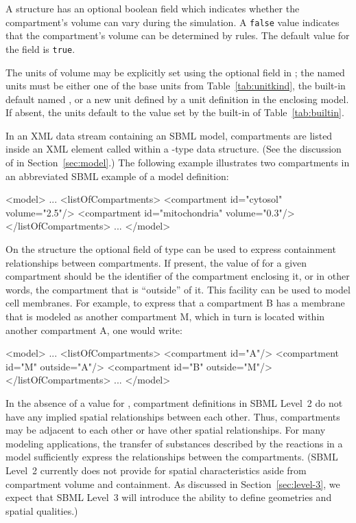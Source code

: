 \documentclass[10pt]{cekarticle}
\newcommand{\vref}[1]{\ref{#1}}
\begin{document}
A  structure has an optional 
boolean field which indicates whether the compartment's volume can
vary during the simulation.  A \texttt{false} value indicates that
the compartment's volume can be determined by rules.
The default value for the  field is
\texttt{true}.

The units of volume may be explicitly set using the optional field
 in ; the named units must be either one
of the base units from Table~\vref{tab:unitkind}, the built-in default
named , or a new unit defined by a unit definition in the
enclosing model.  If absent, the units default to the value set by the
built-in  of Table~\ref{tab:builtin}.

In an XML data stream containing an SBML model, compartments are listed
inside an XML element called  within a
-type data structure.  (See the discussion of  in
Section~\ref{sec:model}.)  The following example illustrates two
compartments in an abbreviated SBML example of a model definition:

\begin{example}
<model>
    ...
    <listOfCompartments>
        <compartment id="cytosol" volume="2.5"/>
        <compartment id="mitochondria" volume="0.3"/>
    </listOfCompartments>
    ...
</model>
\end{example}

On the  structure the optional field  of type  can be used to express containment relationships between compartments. If present, the value of  for a given compartment should be the identifier of the compartment enclosing it, or in other words, the compartment that is ``outside'' of it.  This facility can be used to model cell membranes.  For example, to express that a compartment B has a membrane that is modeled as another compartment M, which in turn is located within another compartment A, one would write:
\begin{example}
<model>
    ...
    <listOfCompartments>
        <compartment id="A"/>
        <compartment id="M" outside="A"/>
        <compartment id="B" outside="M"/>
    </listOfCompartments>
    ...
</model>
\end{example}

In the absence of a value for , compartment
definitions in SBML Level~2 do not have any implied spatial
relationships between each other.  Thus, compartments may be
adjacent to each other or have other spatial relationships.  For
many modeling applications, the transfer of substances described
by the reactions in a model sufficiently express the relationships
between the compartments.  (SBML Level~2 currently does not
provide for spatial characteristics aside from compartment volume
and containment.  As discussed in Section~\ref{sec:level-3}, we
expect that SBML Level~3 will introduce the ability to define
geometries and spatial qualities.)
\end{document}

